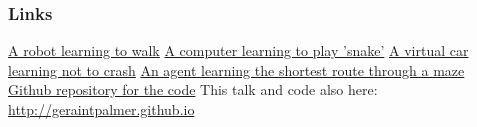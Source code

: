 \documentclass{beamer}
\begin{document}
  \begin{frame}
  	\frametitle{Links}
	\href{https://www.youtube.com/watch?v=CthhCy-1Jeg}{A robot learning to walk} \newline
	\href{https://www.youtube.com/watch?v=kM89G5dE-og}{A computer learning to play 'snake'} \newline
	\href{https://www.youtube.com/watch?v=zOgSC---rgM}{A virtual car learning not to crash} \newline
	\href{https://www.youtube.com/watch?v=X33xYf4UlVw}{An agent learning the shortest route through a maze} \newline
	\newline
	\href{https://github.com/geraintpalmer/Python_Namibia_2015}{Github repository for the code} \newline
	This talk and code also here: \href{http://geraintpalmer.github.io}{http://geraintpalmer.github.io}
  \end{frame}
  
\end{document}

